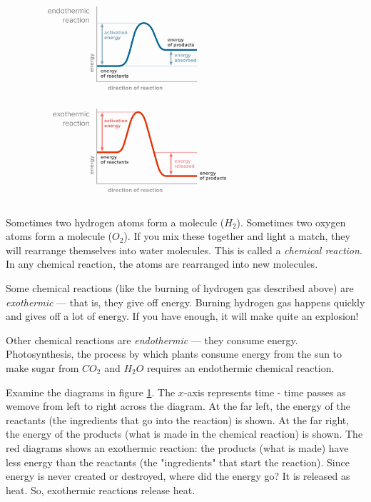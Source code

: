 \begin{figure}
\noindent\includegraphics[width=3in]{exo_endo_diagrams.png}
\caption{}
\label{fig:exo_endo_diagrams}
\end{figure}

Sometimes two hydrogen atoms form a molecule ($H_2$). Sometimes two oxygen
atoms form a molecule ($O_2$). If you mix these together and light a match,
they will rearrange themselves into water molecules. This is called a \textit{
chemical reaction}. In any chemical reaction, the atoms are rearranged into new
molecules.

Some chemical reactions (like the burning of hydrogen gas described above) are
\textit{exothermic} --- that is, they give off energy. Burning hydrogen gas
happens quickly and gives off a lot of energy. If you have enough, it will make
quite an explosion! 

Other chemical reactions are \textit{endothermic} --- they consume energy.
Photosynthesis, the process by which plants consume energy from the sun to make
sugar from $CO_2$ and $H_2O$ requires an endothermic chemical reaction.

Examine the diagrams in figure \ref{fig:exo_endo_diagrams}. The $x$-axis 
represents time - time passes as wemove from left to right across the diagram. 
At the far left, the energy of the reactants (the ingredients that go into the 
reaction) is shown. At the far right, the energy of the products (what is made in 
the chemical reaction) is shown. The red diagrams shows an exothermic reaction: 
the products (what is made) have less energy than the reactants (the "ingredients"
that start the reaction). Since energy is never created or destroyed, where did 
the energy go? It is released as heat. So, exothermic reactions release heat.

